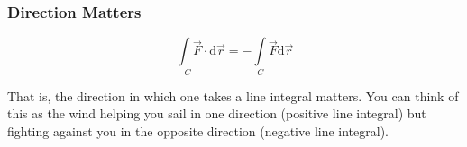 \subsubsection{Direction Matters}
\noindent
\begin{lemma}
	\begin{equation*}
		\int\limits_{-C}{\vec{F} \cdot \mathrm{d}\vec{r}} = -\int\limits_{C}{\vec{F}\mathrm{d}\vec{r}}
	\end{equation*}
\end{lemma}
That is, the direction in which one takes a line integral matters. You can think of this as the wind helping you sail in one direction (positive line integral) but fighting against you in the opposite direction (negative line integral).
